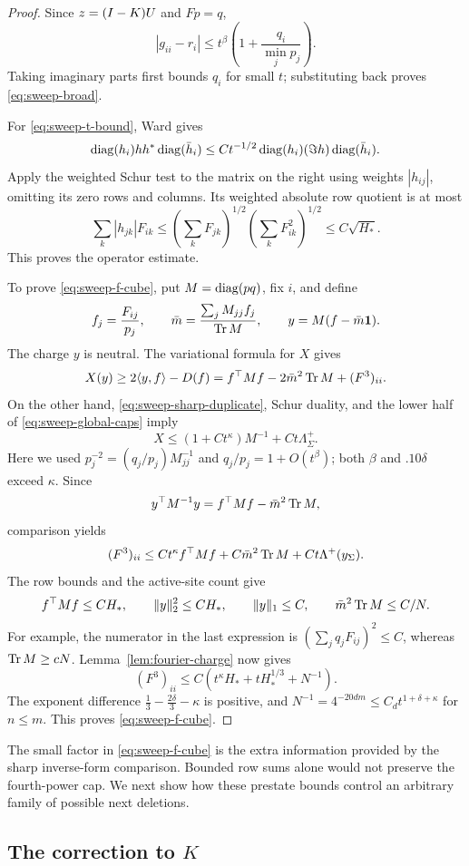 \begin{proof}
Since $z=(I-K)U$ and $Fp=q$,
\[
 |g_{ii}-r_i|
 \le t^\beta\left(1+\frac{q_i}{\min_jp_j}\right).
\]
Taking imaginary parts first bounds $q_i$ for small $t$; substituting
back proves \eqref{eq:sweep-broad}.

For \eqref{eq:sweep-t-bound}, Ward gives
\[
 \operatorname{diag}(h_i)hh^*\operatorname{diag}(\bar h_i)
 \le Ct^{-1/2}\operatorname{diag}(h_i)(\Im h)\operatorname{diag}(\bar h_i).
\]
Apply the weighted Schur test to the matrix on the right using weights
$|h_{ij}|$, omitting its zero rows and columns. Its weighted absolute
row quotient is at most
\[
 \sum_k|h_{jk}|F_{ik}
 \le\left(\sum_kF_{jk}\right)^{1/2}
       \left(\sum_kF_{ik}^2\right)^{1/2}
 \le C\sqrt{H_*}.
\]
This proves the operator estimate.

To prove \eqref{eq:sweep-f-cube}, put $M=\operatorname{diag}(pq)$, fix $i$, and
define
\[
 f_j=\frac{F_{ij}}{p_j},\qquad
 \bar m=\frac{\sum_jM_{jj}f_j}{\operatorname{Tr} M},\qquad
 y=M(f-\bar m\mathbf1).
\]
The charge $y$ is neutral. The variational formula for $X$ gives
\[
 X(y)\ge2\langle y,f\rangle-D(f)
       =f^\top Mf-2\bar m^2\operatorname{Tr} M+(F^3)_{ii}.
\]
On the other hand, \eqref{eq:sweep-sharp-duplicate}, Schur duality,
and the lower half of \eqref{eq:sweep-global-caps} imply
\[
 X\le(1+Ct^\kappa)M^{-1}+Ct\Lambda^+_\Sigma.
\]
Here we used $p_j^{-2}=(q_j/p_j)M_{jj}^{-1}$ and
$q_j/p_j=1+O(t^\beta)$; both $\beta$ and $.10\delta$ exceed $\kappa$.
Since
\[
 y^\top M^{-1}y=f^\top Mf-\bar m^2\operatorname{Tr} M,
\]
comparison yields
\[
 (F^3)_{ii}\le
 Ct^\kappa f^\top Mf+C\bar m^2\operatorname{Tr} M+Ct\Lambda^+(y_\Sigma).
\]
The row bounds and the active-site count give
\[
 f^\top Mf\le CH_*,\qquad
 \|y\|_2^2\le CH_*,\qquad
 \|y\|_1\le C,\qquad
 \bar m^2\operatorname{Tr} M\le C/N.
\]
For example, the numerator in the last expression is
$(\sum_jq_jF_{ij})^2\le C$, whereas $\operatorname{Tr} M\ge cN$.
Lemma~\ref{lem:fourier-charge} now gives
\[
 (F^3)_{ii}\le C(t^\kappa H_*+tH_*^{1/3}+N^{-1}).
\]
The exponent difference
$\frac13-\frac{2\delta}{3}-\kappa$ is positive, and
$N^{-1}=4^{-20dm}\le C_dt^{1+\delta+\kappa}$ for $n\le m$.
This proves \eqref{eq:sweep-f-cube}.
\end{proof}

The small factor in \eqref{eq:sweep-f-cube} is the extra information
provided by the sharp inverse-form comparison. Bounded row sums alone
would not preserve the fourth-power cap. We next show how these
prestate bounds control an arbitrary family of possible next deletions.

\subsection{The correction to \texorpdfstring{$K$}{K}}

